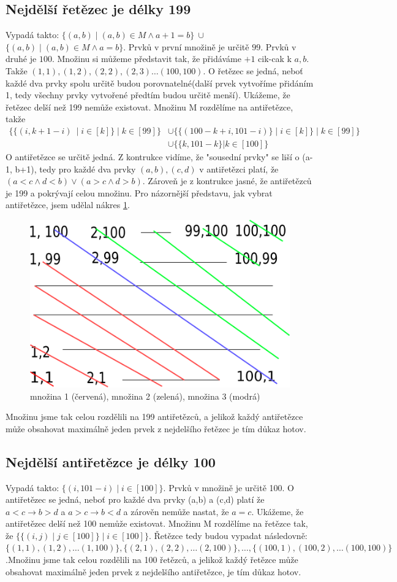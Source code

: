 \documentclass{article}
\begin{document}
\subsection{Nejdělší řetězec je délky 199}
Vypadá takto: $\{(a,b) \mid (a,b) \in M \wedge  a + 1 = b\}\ \cup$ $\{(a,b) \mid (a,b) \in M \wedge  a = b\}$. Prvků v první množině je určitě $99$. Prvků v druhé je $100$. Množinu si můžeme představit tak, že přidáváme $+ 1$ cik-cak k $a,b$. Takže $(1,1),(1,2),(2,2),(2,3)\dots(100,100)$. O řetězec se jedná, neboť každé dva prvky spolu určitě budou porovnatelné(další prvek vytvoříme přidáním 1, tedy všechny prvky vytvořené předtím budou určitě menší).
Ukážeme, že řetězec delší než 199 nemůže existovat. Množinu M rozdělíme na antiřetězce, takže
\begin{equation}
    \begin{split}
    \{\{(i, k+1-i)\ \mid i \in [k] \} \mid k  \in [99]\} &\cup \{\{(100-k+i, 101-i)\} \mid i \in [k] \} \mid k  \in [99] \}\\
        &\cup \{\{k,101-k\} | k \in [100]\}
    \end{split}
\end{equation}
O antiřetězce se určitě jedná. Z kontrukce vidíme, že "sousední prvky" se liší o (a-1, b+1), tedy pro každé dva prvky $(a, b), (c, d)$ v antiřetězci platí, že $ (a < c \wedge d < b) \vee (a > c \wedge d > b)$. Zároveň je z kontrukce jasné, že antiřetězců je 199 a pokrývají celou množinu.
Pro názornější představu, jak vybrat antiřetězce, jsem udělal nákres \ref{fig:ret}.
\begin{figure}[htpb]
    \centering
    \includegraphics[width=0.4\linewidth]{4.png}
    \caption{množina 1 (červená), množina 2 (zelená), množina 3 (modrá)}%
    \label{fig:ret}
\end{figure}
Množinu jsme tak celou rozdělili na 199 antiřetězců, a jelikož každý antiřetězce může obsahovat maximálně jeden prvek z nejdelšího řetězec je tím důkaz hotov.

\subsection{Nejdělší antiřetězce je délky 100}
Vypadá takto: $\{(i,101-i) \mid i \in [100]\}$. Prvků v množině je určitě 100. O antiřetězec se jedná, neboť pro každé dva prvky (a,b) a (c,d) platí že $a < c \rightarrow b > d$ a $a > c \rightarrow b < d$ a zárověn nemůže nastat, že $a=c$.
Ukážeme, že antiřetězec delší než 100 nemůže existovat. Množinu M rozdělíme na řetězce tak, že $ \{\{(i,j) \mid j \in [100]\} \mid i \in [100]\}$. Řetězce tedy budou vypadat následovně: $\{(1,1),(1,2),\dots (1,100)\},\{(2,1),(2,2),\dots (2,100)\},\dots,\{(100,1),(100,2),\dots (100,100)\}$.Množinu jsme tak celou rozdělili na 100 řetězců, a jelikož každý řetězce může obsahovat maximálně jeden prvek z nejdelšího antiřetězce, je tím důkaz hotov.
\end{document}
